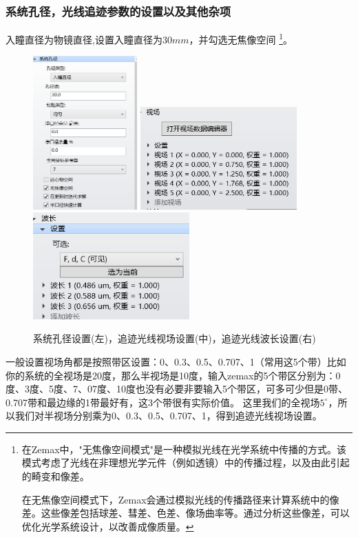 \documentclass{article}
\begin{document}
\subsubsection{系统孔径，光线追迹参数的设置以及其他杂项}
入瞳直径为物镜直径,设置入瞳直径为$30mm$，并勾选无焦像空间
\footnote{在Zemax中，"无焦像空间模式"是一种模拟光线在光学系统中传播的方式。该模式考虑了光线在非理想光学元件（例如透镜）中的传播过程，以及由此引起的畸变和像差。

在无焦像空间模式下，Zemax会通过模拟光线的传播路径来计算系统中的像差。这些像差包括球差、彗差、色差、像场曲率等。通过分析这些像差，可以优化光学系统设计，以改善成像质量。}。
\begin{figure}[H]
  \centering
  \includegraphics[width=4cm]{img/6.png}
  \includegraphics[width=6cm]{img/7.png}
  \includegraphics[width=6cm]{img/8.png}

\caption{系统孔径设置(左)，追迹光线视场设置(中)，追迹光线波长设置(右)}
  \end{figure}
  一般设置视场角都是按照带区设置：0、0.3、0.5、0.707、1（常用这5个带）比如你的系统的全视场是20度，那么半视场是10度，输入zemax的5个带区分别为：0度、3度、5度、7、07度、10度也没有必要非要输入5个带区，可多可少但是0带、0.707带和最边缘的1带最好有，这3个带很有实际价值。
  这里我们的全视场$5^{\circ}$，所以我们对半视场分别乘为0、0.3、0.5、0.707、1，得到追迹光线视场设置。
\end{document}
